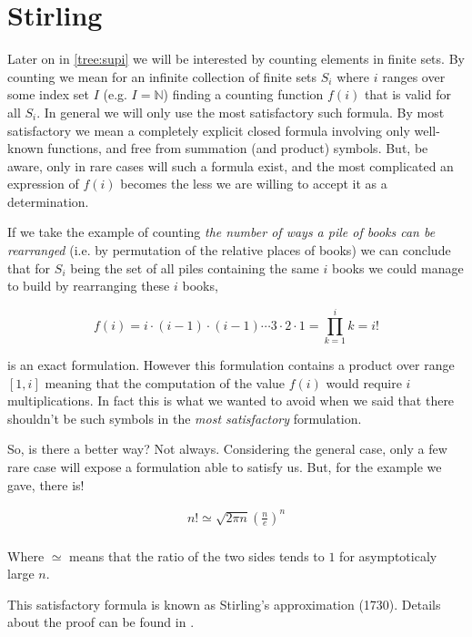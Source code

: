 \section{Stirling}
\label{tree:sorting:stirling}

Later on in \ref{tree:supi} we will be interested by counting elements in finite sets. By counting we mean for an infinite collection of finite sets $S_i$ where $i$ ranges over some index set $I$ (e.g. $I = \mathbb{N}$) finding a counting function $f(i)$ that is valid for all $S_i$. In general we will only use the most satisfactory such formula. By most satisfactory we mean a completely explicit closed formula involving only well-known functions, and free from summation (and product) symbols. But, be aware, only in rare cases will such a formula exist, and the most complicated an expression of $f(i)$ becomes the less we are willing to accept it as a determination. \cite{Stanley:2011:ECV:2124415}

If we take the example of counting \emph{the number of ways a pile of books can be rearranged} (i.e. by permutation of the relative places of books) we can conclude that for $S_i$ being the set of all piles containing the same $i$ books we could manage to build by rearranging these $i$ books,

$$ f(i) = i \cdot (i-1) \cdot (i-1) \cdots 3 \cdot 2 \cdot 1 = \prod_{k=1}^i k = i! $$

is an exact formulation. However this formulation contains a product over range $[1, i]$ meaning that the computation of the value $f(i)$ would require $i$ multiplications. In fact this is what we wanted to avoid when we said that there shouldn't be such symbols in the \emph{most satisfactory} formulation.

So, is there a better way? Not always. Considering the general case, only a few rare case will expose a formulation able to satisfy us. But, for the example we gave, there is!


\begin{theorem}
\label{tree:sorting:theorem/stirling}
\begin{align*}
n! \simeq \sqrt{2 \pi n} \left(\frac{n}{e}\right)^n\\
\end{align*}
\end{theorem}


Where $\simeq$ means that the ratio of the two sides tends to $1$ for asymptoticaly large $n$.

This satisfactory formula is known as Stirling's approximation (1730). Details about the proof can be found in \cite{feller1967direct}.

